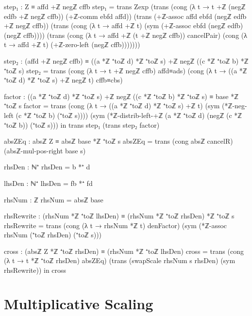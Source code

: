 \documentclass[11pt,a4paper]{book}
\begin{document}
\begin{code}
        step₁ : Z ≡ affd +ℤ negℤ cffb
        step₁ =
          trans
            Zexp
            (trans
              (cong (λ t → t +ℤ (negℤ edfb +ℤ negℤ cffb)) (+ℤ-comm ebfd affd))
              (trans
                (+ℤ-assoc affd ebfd (negℤ edfb +ℤ negℤ cffb))
                (trans
                  (cong (λ t → affd +ℤ t) (sym (+ℤ-assoc ebfd (negℤ edfb) (negℤ cffb))))
                  (trans
                    (cong (λ t → affd +ℤ (t +ℤ negℤ cffb)) cancelPair)
                    (cong (λ t → affd +ℤ t) (+ℤ-zero-left (negℤ cffb)))))))

        step₂ : (affd +ℤ negℤ cffb) ≡ ((a *ℤ ⁺toℤ d) *ℤ ⁺toℤ s) +ℤ negℤ ((c *ℤ ⁺toℤ b) *ℤ ⁺toℤ s)
        step₂ =
          trans
            (cong (λ t → t +ℤ negℤ cffb) affd≡ads)
            (cong (λ t → ((a *ℤ ⁺toℤ d) *ℤ ⁺toℤ s) +ℤ negℤ t) cffb≡cbs)

        factor : ((a *ℤ ⁺toℤ d) *ℤ ⁺toℤ s) +ℤ negℤ ((c *ℤ ⁺toℤ b) *ℤ ⁺toℤ s)
                  ≡
                 base *ℤ ⁺toℤ s
        factor =
          trans
            (cong (λ t → ((a *ℤ ⁺toℤ d) *ℤ ⁺toℤ s) +ℤ t)
              (sym (*ℤ-neg-left (c *ℤ ⁺toℤ b) (⁺toℤ s))))
            (sym (*ℤ-distrib-left-+ℤ (a *ℤ ⁺toℤ d) (negℤ (c *ℤ ⁺toℤ b)) (⁺toℤ s)))
      in
      trans step₁ (trans step₂ factor)

    absZEq : absℤ Z ≡ absℤ base *ℤ ⁺toℤ s
    absZEq = trans (cong absℤ cancelR) (absℤ-mul-pos-right base s)

    rhsDen : ℕ⁺
    rhsDen = b *⁺ d

    lhsDen : ℕ⁺
    lhsDen = fb *⁺ fd

    rhsNum : ℤ
    rhsNum = absℤ base

    rhsRewrite : (rhsNum *ℤ ⁺toℤ lhsDen) ≡ (rhsNum *ℤ ⁺toℤ rhsDen) *ℤ ⁺toℤ s
    rhsRewrite =
      trans
        (cong (λ t → rhsNum *ℤ t) denFactor)
        (sym (*ℤ-assoc rhsNum (⁺toℤ rhsDen) (⁺toℤ s)))

    cross : (absℤ Z *ℤ ⁺toℤ rhsDen) ≡ (rhsNum *ℤ ⁺toℤ lhsDen)
    cross =
      trans
        (cong (λ t → t *ℤ ⁺toℤ rhsDen) absZEq)
        (trans
          (swapScale rhsNum s rhsDen)
          (sym rhsRewrite))
  in
  cross
\end{code}

\section{Multiplicative Scaling}
\end{document}
